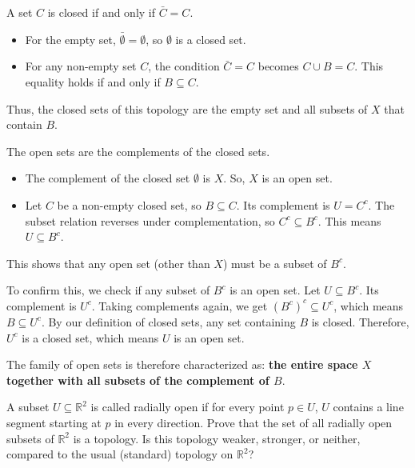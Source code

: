 \begin{solution}
  A set $C$ is closed if and only if $\bar{C} = C$.
  \begin{itemize}
      \item For the empty set, $\bar{\emptyset} = \emptyset$, so $\emptyset$ is a closed set.
      \item For any non-empty set $C$, the condition $\bar{C} = C$ becomes $C \cup B = C$. This equality holds if and only if $B \subseteq C$.
  \end{itemize}
  Thus, the closed sets of this topology are the empty set and all subsets of $X$ that contain $B$.

  The open sets are the complements of the closed sets.
  \begin{itemize}
      \item The complement of the closed set $\emptyset$ is $X$. So, $X$ is an open set.
      \item Let $C$ be a non-empty closed set, so $B \subseteq C$. Its complement is $U = C^c$. The subset relation reverses under complementation, so $C^c \subseteq B^c$. This means $U \subseteq B^c$.
  \end{itemize}
  This shows that any open set (other than $X$) must be a subset of $B^c$.

  To confirm this, we check if any subset of $B^c$ is an open set. Let $U \subseteq B^c$. Its complement is $U^c$. Taking complements again, we get $(B^c)^c \subseteq U^c$, which means $B \subseteq U^c$. By our definition of closed sets, any set containing $B$ is closed. Therefore, $U^c$ is a closed set, which means $U$ is an open set.

  The family of open sets is therefore characterized as: \textbf{the entire space $X$ together with all subsets of the complement of $B$}.
\end{solution}

\begin{problem}
  A subset $U \subseteq \mathbb{R}^2$ is called radially open if for every point $p \in U$, $U$ contains a line segment starting at $p$ in every direction. Prove that the set of all radially open subsets of $\mathbb{R}^2$ is a topology. Is this topology weaker, stronger, or neither, compared to the usual (standard) topology on $\mathbb{R}^2$?
\end{problem}


